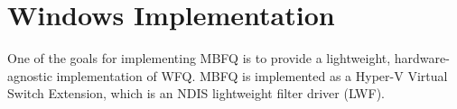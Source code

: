 \section{Windows Implementation}
\label{sec:implementation}

One of the goals for implementing MBFQ is to provide a lightweight, hardware-agnostic implementation of WFQ.
MBFQ is implemented as a Hyper-V Virtual Switch Extension, which is an NDIS lightweight filter driver (LWF).

